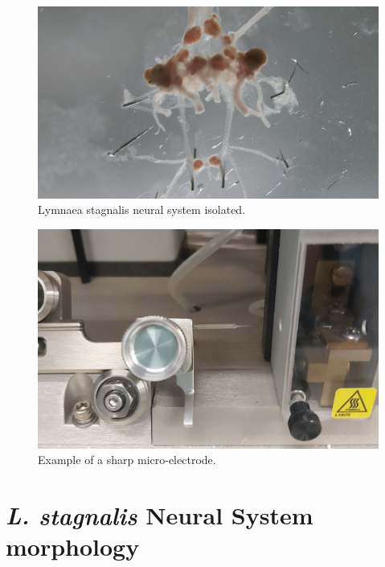 \begin{figure}[htb!]
	\centering
	\includegraphics[angle=180,width=0.45\linewidth]{img/methods/IMG00027.jpg}
	\caption{Lymnaea stagnalis neural system isolated.}
	\label{fig:preparation}
\end{figure}


\begin{figure}[htb!]
	\centering
	\includegraphics[width=0.45\linewidth]{img/methods/preparation/electrode4_zoom.jpg}
	\caption{Example of a sharp micro-electrode.}
	\label{fig:electrode}
\end{figure}

\section{\textit{L. stagnalis} Neural System morphology}

